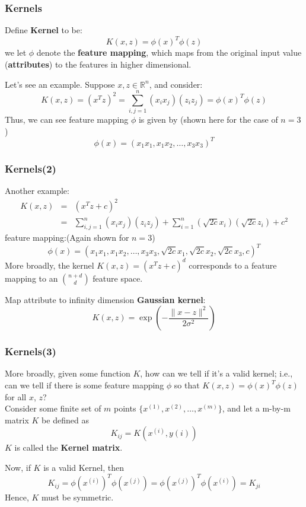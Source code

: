 \documentclass[slidestop,compress,mathserif]{beamer}
\begin{document}
    \begin{frame}
    	\frametitle{Kernels}
    	Define \textbf{Kernel} to be:
    	$$K(x,z)=\phi(x)^T\phi(z)$$
    	we let $\phi$ denote the \textbf{feature mapping}, which 
    	maps from the original input value (\textbf{attributes}) to
    	the features in higher dimensional.
    	
    	Let's see an example. Suppose $x,z\in \mathbb{R}^n$, and
    	consider:
    	$$K(x,z)=(x^Tz)^2=\sum_{i,j=1}^n(x_ix_j)(z_iz_j)=
    	\phi(x)^T\phi(z)$$
    	Thus, we can see feature mapping $\phi$ is given by 
    	(shown here for the case of $n=3$)
    	$$\phi(x)=(x_1x_1,x_1x_2,\ldots,x_3x_3)^T$$
    	
    	 
    \end{frame}
    \begin{frame}[shrink]
    	\frametitle{Kernels(2)}
    	Another example:
    	\begin{eqnarray*}
    		K(x,z) &=& (x^Tz+c)^2\\
    		&=& \sum_{i,j=1}^n(x_ix_j)(z_iz_j)+\sum_{i=1}^n
    		(\sqrt{2c}x_i)(\sqrt{2c}z_i)+c^2
    	\end{eqnarray*}
    	feature mapping:(Again shown for $n=3$)
    	$$\phi(x)=(x_1x_1,x_1x_2,\ldots,x_3x_3,\sqrt{2c}x_1,
    	\sqrt{2c}x_2,\sqrt{2c}x_3,c)^T$$
    	More broadly, the kernel $K(x,z)=(x^Tz+c)^d$ corresponds
    	to a feature mapping to an ${n+d}\choose{d}$ feature space.
    	
    	Map attribute to infinity dimension \textbf{Gaussian kernel}:
    	$$K(x,z)=\exp \left(-\frac{\|x-z\|^2}{2\sigma^2}\right)$$
    \end{frame}
    \begin{frame}
    	\frametitle{Kernels(3)}
    	More broadly, given some function $K$, how can we tell if 
    	it's a valid kernel; i.e., can we tell if there is some 
    	feature mapping $\phi$ so that $K(x,z)=\phi(x)^T\phi(z)$ for
    	all $x$, $z$?
    	\\
    	Consider some finite set of $m$ points $\{x^{(1)},x^{(2)},
    	\ldots,x^{(m)}\}$, and let a m-by-m matrix $K$ be defined
    	as
    	$$K_{ij}=K(x^{(i)},y{(i)})$$
    	$K$ is called the \textbf{Kernel matrix}.
    	
    	Now, if $K$ is a valid Kernel, then 
    	$$K_{ij}=
   	    \phi(x^{(i)})^T\phi(x^{(j)})=\phi(x^{(j)})^T\phi(x^{(i)})
   	    =K_{ji}$$
   	    Hence, $K$ must be symmetric. 
    \end{frame}
\end{document}
